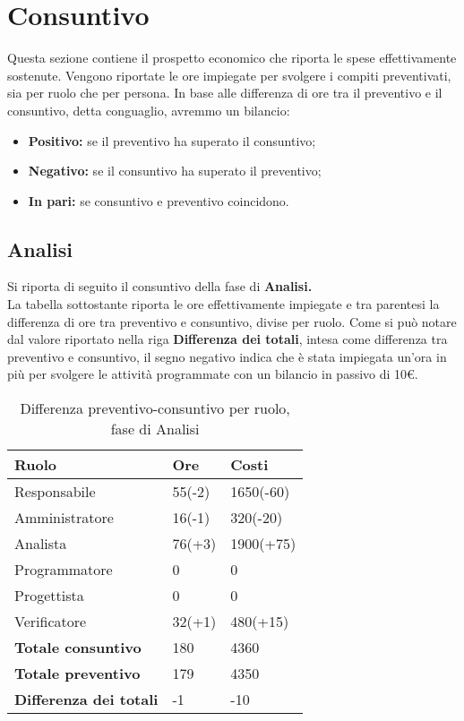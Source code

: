 \section{Consuntivo}
Questa sezione contiene il prospetto economico che riporta le spese effettivamente sostenute. Vengono riportate le ore impiegate per svolgere i compiti preventivati, sia per
ruolo che per persona. In base alle differenza di ore tra il preventivo e il consuntivo, detta conguaglio, avremmo un bilancio:
\begin{itemize}
\item \textbf{Positivo:} se il preventivo ha superato il consuntivo;
\item \textbf{Negativo:} se il consuntivo ha superato il preventivo;
\item \textbf{In pari:} se consuntivo e preventivo coincidono.
\end{itemize}

\subsection{Analisi}

Si riporta di seguito il consuntivo della fase di \textbf{Analisi.}\\
La tabella sottostante riporta le ore effettivamente impiegate e tra parentesi la differenza di ore tra preventivo e consuntivo, divise per ruolo. Come si può notare dal valore riportato nella riga \textbf{Differenza dei totali}, intesa come differenza tra preventivo e consuntivo, il segno negativo indica che è stata impiegata un'ora in più per svolgere le attività programmate con un bilancio in passivo di 10\euro.

	\begin{table}[H]
		\centering
	  \begin{tabular}{p{}p{}
		    							p{}}
		   \toprule Ruolo & Ore & Costi \\
		   \midrule
		   Responsabile & 55(-2) & 1650(-60) \\
		   Amministratore & 16(-1) & 320(-20) \\
		   Analista & 76(+3) & 1900(+75) \\
		   Programmatore & 0 & 0 \\
		   Progettista & 0 & 0 \\
		   Verificatore & 32(+1) & 480(+15) \\
		   \hline
		   \textbf{Totale consuntivo} & 180 & 4360 \\
		   \textbf{Totale preventivo} & 179 & 4350 \\
		   \textbf{Differenza dei totali} & -1 & -10 \\
		   \bottomrule
	 \end{tabular}
	 	\label{tab:costuntivoRequisiti}
	 	\caption{Differenza preventivo-consuntivo per ruolo, fase di Analisi}
	\end{table}

